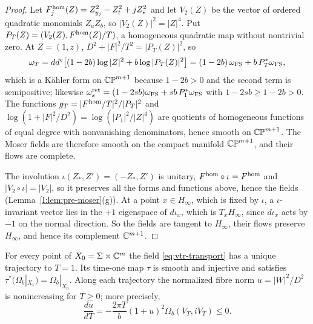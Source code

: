 \begin{proof}
Let $F^{\rm hom}_j(Z)=Z_{y_j}^2-Z_t^2+jZ_*^2$ and let $V_2(Z)$ be the vector of ordered quadratic monomials $Z_aZ_b$, so
$|V_2(Z)|^2=|Z|^4$. Put $P_T(Z)=(V_2(Z),F^{\rm hom}(Z)/T)$, a homogeneous quadratic map without nontrivial zero. At $Z=(1,z)$,
$D^2+|F|^2/T^2=|P_T(Z)|^2$, so
\[
 \omega_T=dd^c\bigl[(1-2b)\log|Z|^2+b\log|P_T(Z)|^2\bigr]=(1-2b)\,\omega_{\rm FS}+b\,P_T^*\omega_{\rm FS},
\]
which is a Kähler form on $\mathbb{CP}^{m+1}$ because $1-2b>0$ and the second term is semipositive; likewise $\omega^{\rm
ret}_s=(1-2sb)\omega_{\rm FS}+sb\,P_1^*\omega_{\rm FS}$ with $1-2sb\ge1-2b>0$. The functions $g_T=|F^{\rm hom}/T|^2/|P_T|^2$ and
$\log(1+|F|^2/D^2)=\log(|P_1|^2/|Z|^4)$ are quotients of homogeneous functions of equal degree with nonvanishing denominators, hence
smooth on $\mathbb{CP}^{m+1}$. The Moser fields are therefore smooth on the compact manifold $\mathbb{CP}^{m+1}$, and their flows are complete.

The involution $\iota(Z_*,Z')=(-Z_*,Z')$ is unitary, $F^{\rm hom}\circ\iota=F^{\rm hom}$ and $|V_2\circ\iota|=|V_2|$, so it
preserves all the forms and functions above, hence the fields (Lemma~\ref{I:lem:pre-moser}(g)). At a point $x\in H_\infty$, which is
fixed by $\iota$, a $\iota$-invariant vector lies in the $+1$ eigenspace of $d\iota_x$, which is $T_xH_\infty$, since $d\iota_x$
acts by $-1$ on the normal direction. So the fields are tangent to $H_\infty$, their flows preserve $H_\infty$, and hence its
complement $\mathbb{C}^{m+1}$.
\end{proof}

\begin{proposition}\label{prop:vtr-transport}
For every point of $X_0=\Sigma\times\mathbb{C}^m$ the field \eqref{eq:vtr-transport} has a unique trajectory to $T=1$. Its time-one map
$\tau$ is smooth and injective and satisfies $\tau^*(\Omega_b|_{X_1})=\Omega_b|_{X_0}$. Along each trajectory the normalized fibre
norm $u=|W|^2/D^2$ is nonincreasing for $T\ge0$; more precisely,
\[
 \frac{du}{dT}=-\frac{2\pi T}{b}(1+u)^2\Omega_b(V_T,iV_T)\le0.
\]
\end{proposition}

